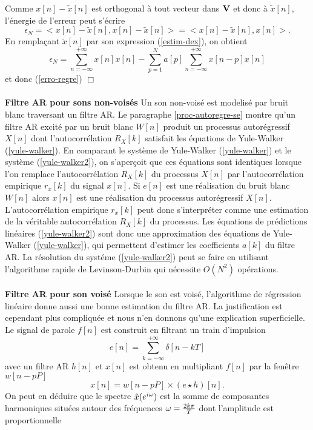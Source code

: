 Comme $x[n] - \tilde x[n]$ est orthogonal
\`a tout vecteur dans
${\bf V}$ et donc \`a $\tilde x[n]$, l'\'energie de l'erreur
peut s'\'ecrire
\[
\epsilon_N =  <x[n] - \tilde x[n] , x[n] - \tilde x[n]> =
<x[n] - \tilde x[n] , x[n]>.
\]
En rempla\c{c}ant $\tilde x[n]$
par son expression (\ref{estim-dex}), on obtient
\[
\epsilon_N = \sum_{n=-\infty}^{+\infty}  x[n] x[n] -
\sum_{p=1}^N a[p] \sum_{n=-\infty}^{+\infty}  x[n-p] x[n]
\]
et donc (\ref{erro-regre})
$\Box$
\\
\\
{\bf Filtre AR pour sons non-vois\'es}
Un son non-vois\'e est modelis\'e par bruit blanc traversant
un filtre AR.
Le paragraphe \ref{proc-autoregre-se} montre qu'un
filtre AR excit\'e par un bruit blanc $W[n]$ produit
un processus autor\'egressif $X[n]$ dont l'autocorr\'elation
$R_X [k]$ satisfait les \'equations de
Yule-Walker (\ref{yule-walker}).
En comparant le syst\`eme de Yule-Walker
(\ref{yule-walker}) et le syst\`eme (\ref{yule-walker2}),
on s'aper\c{c}oit que ces \'equations sont identiques lorsque l'on
remplace l'autocorr\'elation $R_X [k]$ du processus
$X[n]$ par l'autocorr\'elation empirique
$r_x [k]$ du signal $x[n]$.
Si $e[n]$ est une r\'ealisation du bruit blanc $W[n]$ alors $x[n]$
est une r\'ealisation du processus autor\'egressif $X[n]$.
L'autocorr\'elation empirique
$r_x [k]$ peut donc s'interpr\'eter
comme une estimation de la v\'eritable
autocorr\'elation $R_X [k]$ du processus.
Les \'equations de pr\'edictions lin\'eaires
(\ref{yule-walker2}) sont donc une
approximation des \'equations de Yule-Walker (\ref{yule-walker}),
qui permettent d'estimer les coefficients $a[k]$ du filtre AR.
La r\'esolution du syst\'eme (\ref{yule-walker2}) peut
se faire en utilisant l'algorithme rapide
de Levinson-Durbin qui n\'ecessite $O(N^2)$ op\'erations.
\\
\\
{\bf Filtre AR pour son vois\'e}
Lorsque le son est vois\'e, l'algorithme de r\'egression lin\'eaire
donne aussi une bonne estimation du filtre AR. La justification
est cependant plus compliqu\'ee et nous n'en donnons qu'une explication
superficielle.
Le signal de parole $f[n]$ est construit en filtrant
un train d'impulsion
\[
e[n] = \sum_{k=-\infty}^{+\infty} \delta [n -k T]
\]
avec un filtre AR $h[n]$ et $x[n]$ est obtenu
en multipliant $f[n]$ par la fen\^etre $w[n - p P]$
\[
x[n] = w[n-pP] \times  (e \star h)[n] .
\]
On peut en d\'eduire que le spectre $\hat x ({e ^{i \omega}})$ est la
somme de composantes harmoniques situ\'ees autour des fr\'equences
${\omega} = \frac {2 k \pi} T$ dont l'amplitude est proportionnelle
